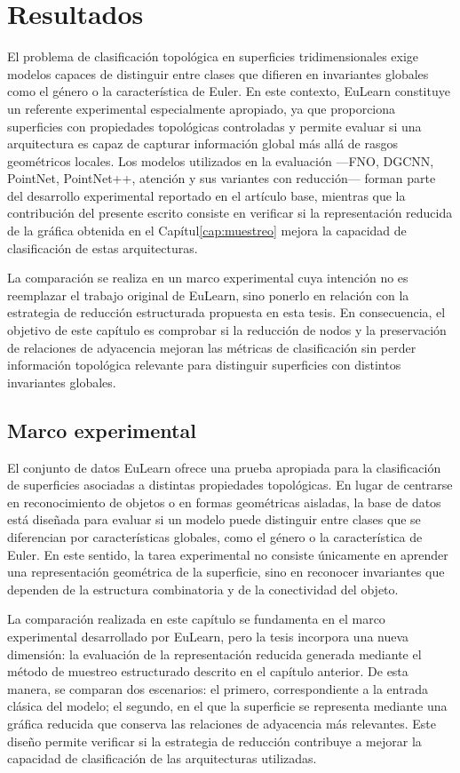 \chapter{Resultados}\label{cap:resultados}
El problema de clasificación topológica en superficies tridimensionales exige modelos capaces de distinguir entre clases que difieren en invariantes globales como el género o la característica de Euler. En este contexto, EuLearn \cite{2025eulearn} constituye un referente experimental especialmente apropiado, ya que proporciona superficies con propiedades topológicas controladas y permite evaluar si una arquitectura es capaz de capturar información global más allá de rasgos geométricos locales. Los modelos utilizados en la evaluación ---FNO, DGCNN, PointNet, PointNet++, atención y sus variantes con reducción--- forman parte del desarrollo experimental reportado en el artículo base, mientras que la contribución del presente escrito consiste en verificar si la representación reducida de la gráfica obtenida en el Capítul\ref{cap:muestreo} mejora la capacidad de clasificación de estas arquitecturas.

La comparación se realiza en un marco experimental cuya intención no es reemplazar el trabajo original de EuLearn, sino ponerlo en relación con la estrategia de reducción estructurada propuesta en esta tesis. En consecuencia, el objetivo de este capítulo es comprobar si la reducción de nodos y la preservación de relaciones de adyacencia mejoran las métricas de clasificación sin perder información topológica relevante para distinguir superficies con distintos invariantes globales.

\section{Marco experimental}
El conjunto de datos EuLearn ofrece una prueba apropiada para la clasificación de superficies asociadas a distintas propiedades topológicas. En lugar de centrarse en reconocimiento de objetos o en formas geométricas aisladas, la base de datos está diseñada para evaluar si un modelo puede distinguir entre clases que se diferencian por características globales, como el género o la característica de Euler. En este sentido, la tarea experimental no consiste únicamente en aprender una representación geométrica de la superficie, sino en reconocer invariantes que dependen de la estructura combinatoria y de la conectividad del objeto.

La comparación realizada en este capítulo se fundamenta en el marco experimental desarrollado por EuLearn, pero la tesis incorpora una nueva dimensión: la evaluación de la representación reducida generada mediante el método de muestreo estructurado descrito en el capítulo anterior. De esta manera, se comparan dos escenarios: el primero, correspondiente a la entrada clásica del modelo; el segundo, en el que la superficie se representa mediante una gráfica reducida que conserva las relaciones de adyacencia más relevantes. Este diseño permite verificar si la estrategia de reducción contribuye a mejorar la capacidad de clasificación de las arquitecturas utilizadas.

